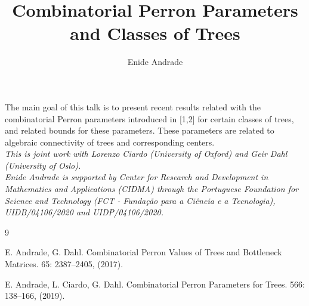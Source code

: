\documentclass[a4paper]{amsart}
\date{}
\begin{document}
\title{Combinatorial Perron Parameters and Classes of Trees}
\author{Enide Andrade} %
\address{Department of Mathematics, University of Aveiro, Portugal} %

\maketitle


The main goal of this talk is to present recent results related with the combinatorial Perron parameters 
introduced in [1,2] for certain classes of trees, and related bounds for these parameters. These parameters are related to algebraic connectivity of trees and corresponding centers.\\



\emph{This is joint work with Lorenzo Ciardo (University of Oxford) and Geir Dahl (University of Oslo).}\\
\emph{Enide Andrade is supported by Center for Research and Development 
in Mathematics and Applications (CIDMA) through the Portuguese 
Foundation for Science and Technology 
(FCT - Funda\c c\~ao para a Ci\^{e}ncia e a Tecnologia), 
UIDB/04106/2020 and UIDP/04106/2020.}\\

\begin{thebibliography}{9}

\item E. Andrade, G. Dahl.
\newblock Combinatorial Perron Values of Trees and Bottleneck Matrices.
  65: 2387--2405,  (2017).

\item
 E. Andrade, L. Ciardo, G. Dahl.
 \newblock Combinatorial Perron Parameters for
Trees.
 566: 138--166, (2019).


\end{thebibliography}
\end{document}
